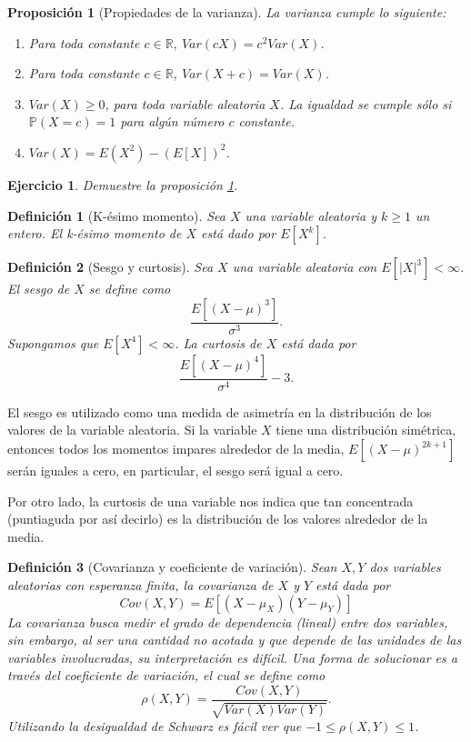 \documentclass[11pt]{report}
\theoremstyle{break}
\newtheorem{definicion}{Definición}[chapter]
\newtheorem{proposicion}{Proposición}[chapter]
\newtheorem{ejercicio}{Ejercicio}[chapter]
\theoremstyle{break}
\begin{document}
\begin{proposicion}[Propiedades de la varianza]
\label{proposicion:propiedades de la varianza}
La varianza cumple lo siguiente:
\begin{enumerate}[label=\alph*)]
\item Para toda constante $c \in \mathbb{R}$, $Var(cX) = c^2Var(X)$.
\item Para toda constante $c \in \mathbb{R}$, $Var(X + c) = Var(X)$.
\item $Var(X) \geq 0$, para toda variable aleatoria $X$. La igualdad se cumple sólo si $\mathbb{P}(X = c)=1$ para algún número $c$ constante.
\item $Var(X) = E(X^2) - (E[X])^2$.
\end{enumerate}
\end{proposicion}

\begin{ejercicio}
Demuestre la proposición \ref{proposicion:propiedades de la varianza}.
\end{ejercicio}

\begin{definicion}[K-ésimo momento]
Sea $X$ una variable aleatoria y $k \geq 1$ un entero. El k-ésimo momento de $X$ está dado por $E[X^k]$.
\end{definicion}

\begin{definicion}[Sesgo y curtosis]
\label{definicion:sesgo y curtosis}
Sea $X$ una variable aleatoria con $E[|X|^3]<\infty$. El sesgo de $X$ se define como
$$
\dfrac{E[(X- \mu)^3]}{\sigma^3}.
$$
Supongamos que $E[X^4] < \infty$. La curtosis de $X$ está dada por
$$
\dfrac{E[(X - \mu)^4]}{\sigma^4} - 3.
$$
\end{definicion}
El sesgo es utilizado como una medida de asimetría en la distribución de los valores de la variable aleatoria. Si la variable $X$ tiene una distribución simétrica, entonces todos los momentos impares alrededor de la media, $E[(X - \mu)^{2k + 1}]$ serán iguales a cero, en particular, el sesgo será igual a cero.

Por otro lado, la curtosis de una variable nos indica que tan concentrada (puntiaguda por así decirlo) es la distribución de los valores alrededor de la media.

\begin{definicion}[Covarianza y coeficiente de variación]
\label{definicion:covarianza}
Sean $X,Y$ dos variables aleatorias con esperanza finita, la covarianza de $X$ y $Y$ está dada por
$$
Cov(X,Y) = E[(X - \mu_{X})(Y - \mu_{Y})]
$$
La covarianza busca medir el grado de dependencia (lineal) entre dos variables, sin embargo, al ser una cantidad no acotada y que depende de las unidades de las variables involucradas, su interpretación es difícil. Una forma de solucionar es a través del coeficiente de variación, el cual se define como
$$
\rho(X,Y) = \dfrac{ Cov(X,Y)  }{ \sqrt{Var(X) Var(Y)} }.
$$
Utilizando la desigualdad de Schwarz es fácil ver que $-1\leq \rho(X,Y) \leq 1$.
\end{definicion}
\end{document}
